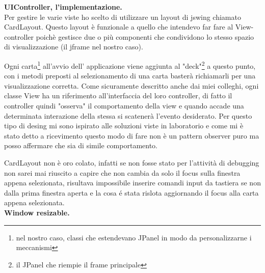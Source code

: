 \documentclass[a4paper,12pt]{report}
\begin{document}
\textbf{UIController, l'implementazione.}\\
Per gestire le varie viste ho scelto di utilizzare un layout di jswing chiamato CardLayout.
Questo layout è funzionale a quello che intendevo far fare al View-controller poichè
gestisce due o più componenti che condividono lo stesso spazio di visualizzazione (il jframe nel nostro caso).

Ogni carta\footnote{nel nostro caso, classi che estendevano JPanel in modo da personalizzarne i meccanismi}
all'avvio dell' applicazione viene aggiunta al "deck"\footnote{il JPanel che riempie il frame principale}
a questo punto, con i metodi preposti al selezionamento di una carta basterà richiamarli per una visualizzazione
corretta.
Come sicuramente descritto anche dai miei colleghi, ogni classe View ha un riferimento all'interfaccia
del loro controller, di fatto il controller quindi "osserva" il comportamento della view e quando accade una
determinata interazione della stessa si scatenerà l'evento desiderato.
Per questo tipo di desing mi sono ispirato alle soluzioni viste in laboratorio e come mi è stato detto
a ricevimento questo modo di fare non è un pattern observer puro ma posso affermare che sia di simile
comportamento.

CardLayout non è oro colato, infatti se non fosse stato per l'attività di debugging non sarei mai riuscito
a capire che non cambia da solo il focus sulla finestra appena selezionata, risultava impossibile
inserire comandi input da tastiera se non dalla prima finestra aperta e la cosa é stata rislota
aggiornando il focus alla carta appena selezionata.\\

\textbf{Window resizable.}\\
\end{document}
